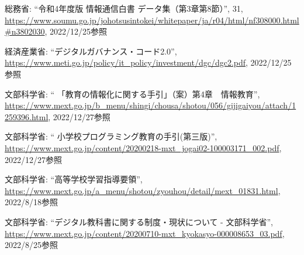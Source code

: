 \documentclass[12pt,a4j,titlepage]{ltjsarticle}
\begin{document}
\begin{thebibliography}{99}
 総務省: ``令和4年度版 情報通信白書 データ集（第3章第8節）'', 31,
\url{https://www.soumu.go.jp/johotsusintokei/whitepaper/ja/r04/html/nf308000.html#n3802030}, 2022/12/25参照

 経済産業省: ``デジタルガバナンス・コード2.0'', \url{https://www.meti.go.jp/policy/it_policy/investment/dgc/dgc2.pdf}, 2022/12/25参照

 文部科学省: `` 「教育の情報化に関する手引」（案）第4章　情報教育'', \url{https://www.mext.go.jp/b_menu/shingi/chousa/shotou/056/gijigaiyou/attach/1259396.html}, 2022/12/27参照

 文部科学省: `` 小学校プログラミング教育の手引(第三版)'', \url{https://www.mext.go.jp/content/20200218-mxt_jogai02-100003171_002.pdf}, 2022/12/27参照

 文部科学省: ``高等学校学習指導要領'', \url{https://www.mext.go.jp/a_menu/shotou/zyouhou/detail/mext_01831.html}, 2022/8/18参照

 文部科学省: ``デジタル教科書に関する制度・現状について - 文部科学省'', \url{https://www.mext.go.jp/content/20200710-mxt_kyokasyo-000008653_03.pdf}, 2022/8/25参照
\end{thebibliography}
\end{document}
